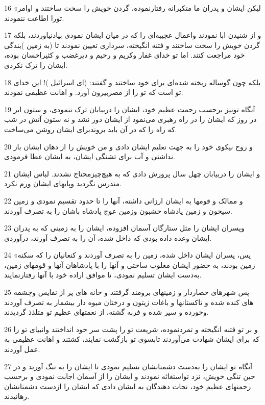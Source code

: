 \par 16 «لیکن ایشان و پدران ما متکبرانه رفتارنموده، گردن خویش را سخت ساختند و اوامر تورا اطاعت ننمودند.
\par 17 و از شنیدن ابا نمودند واعمال عجیبه‌ای را که در میان ایشان نمودی بیادنیاوردند، بلکه گردن خویش را سخت ساختند و فتنه انگیخته، سرداری تعیین نمودند تا (به زمین )بندگی خود مراجعت کنند. اما تو خدای غفار وکریم و رحیم و دیرغضب و کثیراحسان بوده، ایشان را ترک نکردی.
\par 18 بلکه چون گوساله ریخته شده‌ای برای خود ساختند و گفتند: (ای اسرائیل )! این خدای تو است که تو را از مصربیرون آورد. و اهانت عظیمی نمودند.
\par 19 آنگاه تونیز برحسب رحمت عظیم خود، ایشان را دربیابان ترک ننمودی، و ستون ابر در روز که ایشان را در راه رهبری می‌نمود از ایشان دور نشد و نه ستون آتش در شب که راه را که در آن باید بروندبرای ایشان روشن می‌ساخت.
\par 20 و روح نیکوی خود را به جهت تعلیم ایشان دادی و من خویش را از دهان ایشان باز نداشتی و آب برای تشنگی ایشان، به ایشان عطا فرمودی.
\par 21 و ایشان را دربیابان چهل سال پرورش دادی که به هیچ‌چیزمحتاج نشدند. لباس ایشان مندرس نگردید وپایهای ایشان ورم نکرد.
\par 22 و ممالک و قومها به ایشان ارزانی داشته، آنها را تا حدود تقسیم نمودی و زمین سیحون و زمین پادشاه حشبون وزمین عوج پادشاه باشان را به تصرف آوردند.
\par 23 وپسران ایشان را مثل ستارگان آسمان افزوده، ایشان را به زمینی که به پدران ایشان وعده داده بودی که داخل شده، آن را به تصرف آورند، درآوردی.
\par 24 «پس، پسران ایشان داخل شده، زمین را به تصرف آوردند و کنعانیان را که سکنه زمین بودند، به حضور ایشان مغلوب ساختی و آنها را با پادشاهان آنها و قومهای زمین، به‌دست ایشان تسلیم نمودی، تا موافق اراده خود با آنها رفتارنمایند.
\par 25 پس شهرهای حصاردار و زمینهای برومند گرفتند و خانه های پر از نفایس وچشمه های کنده شده و تاکستانها و باغات زیتون و درختان میوه دار بیشمار به تصرف آوردند وخورده و سیر شده و فربه گشته، از نعمتهای عظیم تو متلذذ گردیدند.
\par 26 و بر تو فتنه انگیخته و تمردنموده، شریعت تو را پشت سر خود انداختند وانبیای تو را که برای ایشان شهادت می‌آوردند تابسوی تو بازگشت نمایند، کشتند و اهانت عظیمی به عمل آوردند.
\par 27 آنگاه تو ایشان را به‌دست دشمنانشان تسلیم نمودی تا ایشان را به تنگ آورند و در حین تنگی خویش، نزد تواستغاثه نمودند و ایشان را از آسمان اجابت نمودی و برحسب رحمتهای عظیم خود، نجات دهندگان به ایشان دادی که ایشان را ازدست دشمنانشان رهانیدند. 
